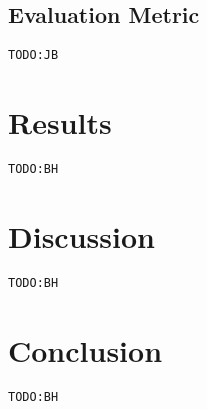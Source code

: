 \documentclass{llncs}
\newcommand{\todo}[1]{\texttt{\color{red}TODO:#1}}
\begin{document}
\subsection{Evaluation Metric}
\todo{JB}

\section{Results}
\todo{BH}

\section{Discussion}
\todo{BH}

\section{Conclusion}
\label{sec:Conclusion}
\todo{BH}




\end{document}
